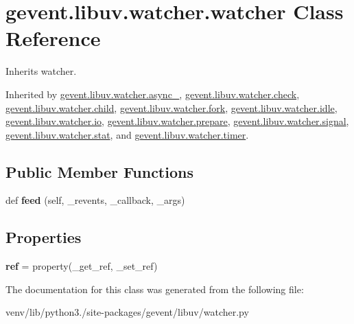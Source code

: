 \hypertarget{classgevent_1_1libuv_1_1watcher_1_1watcher}{}\section{gevent.\+libuv.\+watcher.\+watcher Class Reference}
\label{classgevent_1_1libuv_1_1watcher_1_1watcher}


Inherits watcher.



Inherited by \hyperlink{classgevent_1_1libuv_1_1watcher_1_1async__}{gevent.\+libuv.\+watcher.\+async\+\_\+}, \hyperlink{classgevent_1_1libuv_1_1watcher_1_1check}{gevent.\+libuv.\+watcher.\+check}, \hyperlink{classgevent_1_1libuv_1_1watcher_1_1child}{gevent.\+libuv.\+watcher.\+child}, \hyperlink{classgevent_1_1libuv_1_1watcher_1_1fork}{gevent.\+libuv.\+watcher.\+fork}, \hyperlink{classgevent_1_1libuv_1_1watcher_1_1idle}{gevent.\+libuv.\+watcher.\+idle}, \hyperlink{classgevent_1_1libuv_1_1watcher_1_1io}{gevent.\+libuv.\+watcher.\+io}, \hyperlink{classgevent_1_1libuv_1_1watcher_1_1prepare}{gevent.\+libuv.\+watcher.\+prepare}, \hyperlink{classgevent_1_1libuv_1_1watcher_1_1signal}{gevent.\+libuv.\+watcher.\+signal}, \hyperlink{classgevent_1_1libuv_1_1watcher_1_1stat}{gevent.\+libuv.\+watcher.\+stat}, and \hyperlink{classgevent_1_1libuv_1_1watcher_1_1timer}{gevent.\+libuv.\+watcher.\+timer}.

\subsection*{Public Member Functions}
\begin{DoxyCompactItemize}
\item 
\mbox{\label{classgevent_1_1libuv_1_1watcher_1_1watcher_a449e02fb865fc0285c135d5f49f29e0f}} 
def {\bfseries feed} (self, \+\_\+revents, \+\_\+callback, \+\_\+args)
\end{DoxyCompactItemize}
\subsection*{Properties}
\begin{DoxyCompactItemize}
\item 
\mbox{\label{classgevent_1_1libuv_1_1watcher_1_1watcher_a2d207631c31a71ccb87a261fab8e1c87}} 
{\bfseries ref} = property(\+\_\+get\+\_\+ref, \+\_\+set\+\_\+ref)
\end{DoxyCompactItemize}


The documentation for this class was generated from the following file\+:\begin{DoxyCompactItemize}
\item 
venv/lib/python3./site-\/packages/gevent/libuv/watcher.\+py\end{DoxyCompactItemize}
